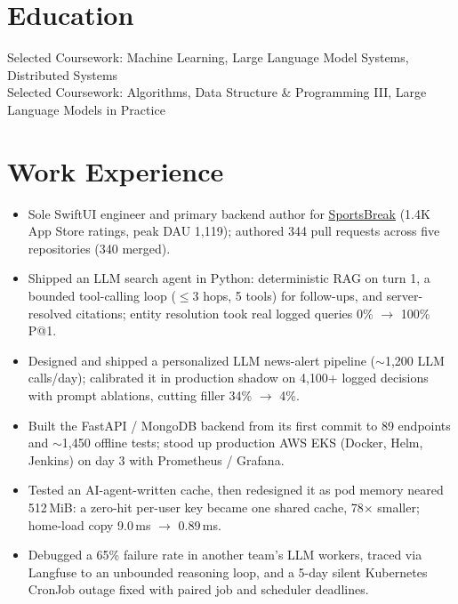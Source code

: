 \documentclass[11pt, letterpaper]{article}
\begin{document}

\section{Education}
Selected Coursework: Machine Learning, Large Language Model Systems, Distributed Systems\\[1pt]
Selected Coursework: Algorithms, Data Structure \& Programming III, Large Language Models in Practice

\section{Work Experience}
\begin{itemize}
  \item Sole SwiftUI engineer and primary backend author for \href{https://apps.apple.com/app/id6762649287}{SportsBreak} (1.4K App Store ratings, peak DAU 1{,}119); authored 344 pull requests across five repositories (340 merged).
  \item Shipped an LLM search agent in Python: deterministic RAG on turn 1, a bounded tool-calling loop ($\le$3 hops, 5 tools) for follow-ups, and server-resolved citations; entity resolution took real logged queries 0\% $\to$ 100\% P@1.
  \item Designed and shipped a personalized LLM news-alert pipeline ($\sim$1{,}200 LLM calls/day); calibrated it in production shadow on 4{,}100+ logged decisions with prompt ablations, cutting filler 34\% $\to$ 4\%.
  \item Built the FastAPI / MongoDB backend from its first commit to 89 endpoints and $\sim$1{,}450 offline tests; stood up production AWS EKS (Docker, Helm, Jenkins) on day 3 with Prometheus / Grafana.
  \item Tested an AI-agent-written cache, then redesigned it as pod memory neared 512\,MiB: a zero-hit per-user key became one shared cache, 78$\times$ smaller; home-load copy 9.0\,ms $\to$ 0.89\,ms.
  \item Debugged a 65\% failure rate in another team's LLM workers, traced via Langfuse to an unbounded reasoning loop, and a 5-day silent Kubernetes CronJob outage fixed with paired job and scheduler deadlines.
\end{itemize}
\end{document}
